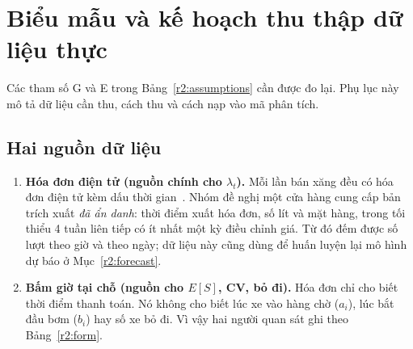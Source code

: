 
\section{Biểu mẫu và kế hoạch thu thập dữ liệu thực}
\label{r2:app-plan}
Các tham số G và E trong Bảng~\ref{r2:assumptions} cần được đo lại. Phụ lục này
mô tả dữ liệu cần thu, cách thu và cách nạp vào mã phân tích.

\subsection{Hai nguồn dữ liệu}
\begin{enumerate}
\item \textbf{Hóa đơn điện tử (nguồn chính cho $\lambda_t$).} Mỗi lần bán xăng
đều có hóa đơn điện tử kèm dấu thời gian~\cite{nd70}. Nhóm đề nghị một cửa hàng
cung cấp bản trích xuất \emph{đã ẩn danh}: thời điểm xuất hóa đơn, số lít và
mặt hàng, trong tối thiểu 4 tuần liên tiếp có ít nhất một kỳ điều chỉnh giá.
Từ đó đếm được số lượt theo giờ và theo ngày; dữ liệu này cũng dùng để huấn
luyện lại mô hình dự báo ở Mục~\ref{r2:forecast}.
\item \textbf{Bấm giờ tại chỗ (nguồn cho $E[S]$, CV, bỏ đi).} Hóa đơn chỉ cho
biết thời điểm thanh toán. Nó không cho biết lúc xe vào hàng chờ ($a_i$), lúc
bắt đầu bơm ($b_i$) hay số xe bỏ đi. Vì vậy hai người quan sát ghi theo Bảng~\ref{r2:form}.
\end{enumerate}

